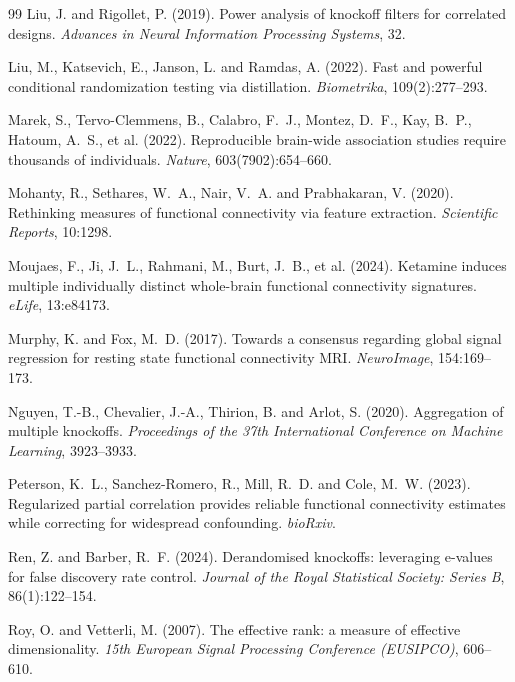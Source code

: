 \documentclass[11pt,a4paper]{article}
\begin{document}
\begin{thebibliography}{99}
Liu, J. and Rigollet, P. (2019).
Power analysis of knockoff filters for correlated designs.
\emph{Advances in Neural Information Processing Systems}, 32.

Liu, M., Katsevich, E., Janson, L. and Ramdas, A. (2022).
Fast and powerful conditional randomization testing via distillation.
\emph{Biometrika}, 109(2):277--293.

Marek, S., Tervo-Clemmens, B., Calabro, F.~J., Montez, D.~F., Kay, B.~P.,
Hatoum, A.~S., et al. (2022).
Reproducible brain-wide association studies require thousands of
individuals.
\emph{Nature}, 603(7902):654--660.

Mohanty, R., Sethares, W.~A., Nair, V.~A. and Prabhakaran, V. (2020).
Rethinking measures of functional connectivity via feature extraction.
\emph{Scientific Reports}, 10:1298.

Moujaes, F., Ji, J.~L., Rahmani, M., Burt, J.~B., et al. (2024).
Ketamine induces multiple individually distinct whole-brain functional
connectivity signatures.
\emph{eLife}, 13:e84173.

Murphy, K. and Fox, M.~D. (2017).
Towards a consensus regarding global signal regression for resting state
functional connectivity MRI.
\emph{NeuroImage}, 154:169--173.

Nguyen, T.-B., Chevalier, J.-A., Thirion, B. and Arlot, S. (2020).
Aggregation of multiple knockoffs.
\emph{Proceedings of the 37th International Conference on Machine Learning},
3923--3933.

Peterson, K.~L., Sanchez-Romero, R., Mill, R.~D. and Cole, M.~W. (2023).
Regularized partial correlation provides reliable functional connectivity
estimates while correcting for widespread confounding.
\emph{bioRxiv}.

Ren, Z. and Barber, R.~F. (2024).
Derandomised knockoffs: leveraging e-values for false discovery rate
control.
\emph{Journal of the Royal Statistical Society: Series B}, 86(1):122--154.

Roy, O. and Vetterli, M. (2007).
The effective rank: a measure of effective dimensionality.
\emph{15th European Signal Processing Conference (EUSIPCO)}, 606--610.


\end{thebibliography}
\end{document}
